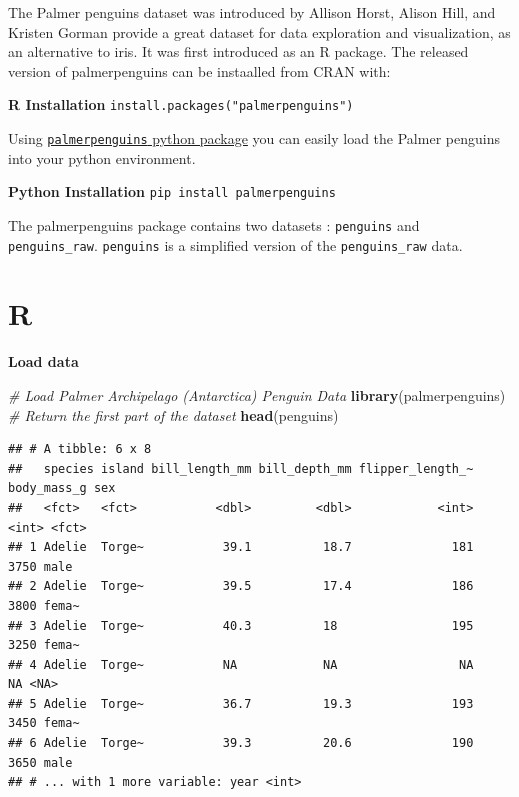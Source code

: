 \documentclass[]{book}
\newenvironment{Shaded}{\begin{snugshade}}{\end{snugshade}}
\newcommand{\CommentTok}[1]{\textcolor[rgb]{0.56,0.35,0.01}{\textit{#1}}}
\newcommand{\KeywordTok}[1]{\textcolor[rgb]{0.13,0.29,0.53}{\textbf{#1}}}
\newcommand{\NormalTok}[1]{#1}
\begin{document}
The Palmer penguins dataset was introduced by Allison Horst, Alison Hill, and Kristen Gorman provide a great dataset for data exploration and visualization, as an alternative to iris. It was first introduced as an R package. The released version of palmerpenguins can be instaalled from CRAN with:

\textbf{R Installation}
\texttt{install.packages("palmerpenguins")}

Using \href{https://pypi.org/project/palmerpenguins/}{\texttt{palmerpenguins} python package} you can easily load the Palmer penguins into your python environment.

\textbf{Python Installation}
\texttt{pip\ install\ palmerpenguins}

The palmerpenguins package contains two datasets : \texttt{penguins} and \texttt{penguins\_raw}. \texttt{penguins} is a simplified version of the \texttt{penguins\_raw} data.

\hypertarget{r-5}{%
\section{R}\label{r-5}}

\textbf{Load data}

\begin{Shaded}
\begin{Highlighting}[]
\CommentTok{# Load Palmer Archipelago (Antarctica) Penguin Data}
\KeywordTok{library}\NormalTok{(palmerpenguins)}
\CommentTok{# Return the first part of the dataset}
\KeywordTok{head}\NormalTok{(penguins)}
\end{Highlighting}
\end{Shaded}

\begin{verbatim}
## # A tibble: 6 x 8
##   species island bill_length_mm bill_depth_mm flipper_length_~ body_mass_g sex  
##   <fct>   <fct>           <dbl>         <dbl>            <int>       <int> <fct>
## 1 Adelie  Torge~           39.1          18.7              181        3750 male 
## 2 Adelie  Torge~           39.5          17.4              186        3800 fema~
## 3 Adelie  Torge~           40.3          18                195        3250 fema~
## 4 Adelie  Torge~           NA            NA                 NA          NA <NA> 
## 5 Adelie  Torge~           36.7          19.3              193        3450 fema~
## 6 Adelie  Torge~           39.3          20.6              190        3650 male 
## # ... with 1 more variable: year <int>
\end{verbatim}
\end{document}
